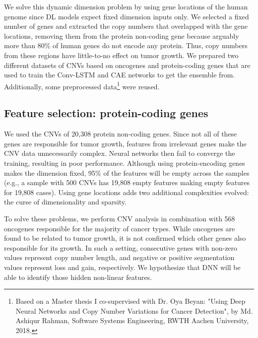 \hspace*{3.5mm} We solve this dynamic dimension problem by using gene locations of the human genome since DL models expect fixed dimension inputs only. We selected a fixed number of genes and extracted the copy numbers that overlapped with the gene locations, removing them from the protein non-coding gene because arguably more than 80\% of human genes do not encode any protein. Thus, copy numbers from these regions have little-to-no effect on tumor growth. %
We prepared two different datasets of CNVs based on oncogenes and protein-coding genes that are used to train the Conv-LSTM and CAE networks to get the ensemble from. Additionally, some preprocessed data\footnote{Based on a Master thesis I co-supervised with Dr. Oya Beyan: "Using Deep Neural Networks and Copy Number Variations for Cancer Detection", by Md. Ashiqur Rahman, Software Systems Engineering, RWTH Aachen University, 2018.} were reused. %

\subsection{Feature selection: protein-coding genes}
We used the CNVs of 20,308 protein non-coding genes. Since not all of these genes are responsible for tumor growth, features from irrelevant genes make the CNV data unnecessarily complex. Neural networks then fail to converge the training, resulting in poor performance. Although using protein-encoding genes makes the dimension fixed, 95\% of the features will be empty across the samples (e.g., a sample with 500 CNVs has 19,808 empty features making empty features for 19,808 cases). Using gene locations adds two additional complexities evolved: the curse of dimensionality and sparsity. 

\hspace*{3.5mm} To solve these problems, we perform CNV analysis in combination with 568 oncogenes responsible for the majority of cancer types. While oncogenes are found to be related to tumor growth, it is not confirmed which other genes also responsible for its growth. In such a setting, consecutive genes with non-zero values represent copy number length, and negative or positive segmentation values represent loss and gain, respectively. We hypothesize that DNN will be able to identify those hidden non-linear features. 

